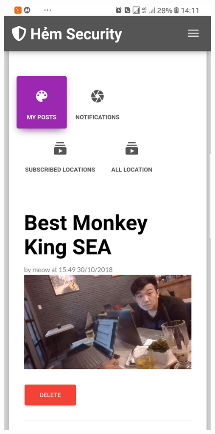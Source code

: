 \begin{figure}[!htb]
  \includegraphics[width=\linewidth]{images/chap4/profile_mb.jpg}
\endminipage\hfill
{}

\end{figure}
